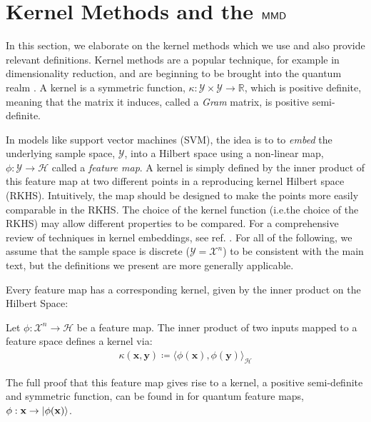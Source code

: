 
\section{Kernel Methods and the \texorpdfstring{$\operatorname{\textsf{MMD}}$}{MMD}}\label{supp_matt:kernelmethods_mmd}
In this section, we elaborate on the kernel methods which we use and also provide relevant definitions. Kernel methods are a popular technique, for example in dimensionality reduction, and are beginning to be brought into the quantum realm . A kernel is a symmetric function, $\kappa:\mathcal{Y}\times\mathcal{Y} \rightarrow \mathbb{R}$, which is positive definite, meaning that the matrix it induces, called a \textit{Gram} matrix, is positive semi-definite.

In models like support vector machines (SVM), the idea is to to \emph{embed} the underlying sample space, $\mathcal{Y}$, into a Hilbert space using a non-linear map, $\phi:\mathcal{Y} \rightarrow \mathcal{H}$ called a \emph{feature map}. A kernel is simply defined by the inner product of this feature map at two different points in a reproducing kernel Hilbert space (RKHS). Intuitively, the map should be designed to make the points more easily comparable in the RKHS.  The choice of the kernel function (i.e.\@ the choice of the RKHS) may allow different properties to be compared.  For a comprehensive review of techniques in kernel embeddings, see ref. . For all of the following, we assume that the sample space is discrete ($\mathcal{Y} = \mathcal{X}^n$) to be consistent with the main text, but the definitions we present are more generally applicable.

Every feature map has a corresponding kernel, given by the inner product on the Hilbert Space:
\begin{theorem}
    Let $\phi: \mathcal{X}^n \rightarrow \mathcal{H}$ be a feature map. The inner product of two inputs mapped to a feature space defines a kernel via:
    \begin{align}
        \kappa(\mathbf{x},\mathbf{y})  \coloneqq \langle\phi(\mathbf{x}),\phi(\mathbf{y}) \rangle_{\mathcal{H}} \label{featurekernel}
    \end{align}
\end{theorem}

The full proof that this feature map gives rise to a kernel, a positive semi-definite and symmetric function, can be found in  for quantum feature maps, $\phi :\mathbf{x}\rightarrow \ket{\phi(\mathbf{x})}$.


